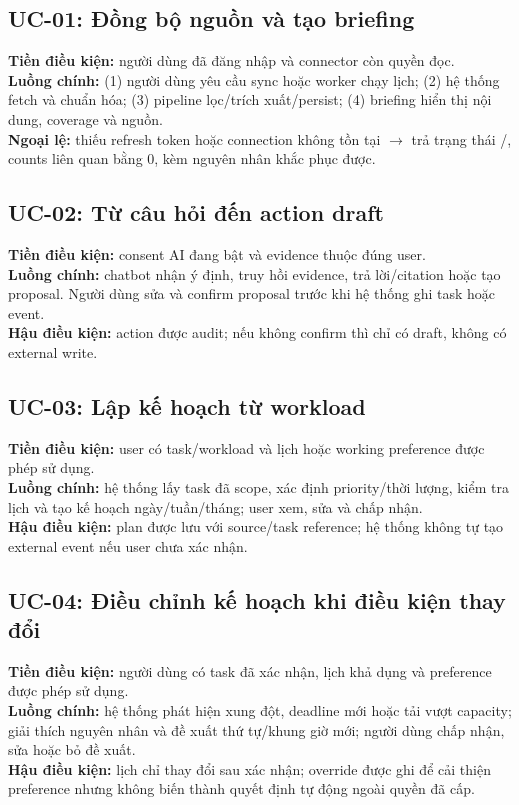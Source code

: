 \documentclass[12pt,a4paper]{article}
\begin{document}
\subsection{UC-01: Đồng bộ nguồn và tạo briefing}
\textbf{Tiền điều kiện:} người dùng đã đăng nhập và connector còn quyền đọc.\\
\textbf{Luồng chính:} (1) người dùng yêu cầu sync hoặc worker chạy lịch; (2) hệ thống fetch và chuẩn hóa; (3) pipeline lọc/trích xuất/persist; (4) briefing hiển thị nội dung, coverage và nguồn.\\
\textbf{Ngoại lệ:} thiếu refresh token hoặc connection không tồn tại $\rightarrow$ trả trạng thái /, counts liên quan bằng 0, kèm nguyên nhân khắc phục được.

\subsection{UC-02: Từ câu hỏi đến action draft}
\textbf{Tiền điều kiện:} consent AI đang bật và evidence thuộc đúng user.\\
\textbf{Luồng chính:} chatbot nhận ý định, truy hồi evidence, trả lời/citation hoặc tạo proposal. Người dùng sửa và confirm proposal trước khi hệ thống ghi task hoặc event.\\
\textbf{Hậu điều kiện:} action được audit; nếu không confirm thì chỉ có draft, không có external write.

\subsection{UC-03: Lập kế hoạch từ workload}
\textbf{Tiền điều kiện:} user có task/workload và lịch hoặc working preference
được phép sử dụng.\\
\textbf{Luồng chính:} hệ thống lấy task đã scope, xác định priority/thời lượng,
kiểm tra lịch và tạo kế hoạch ngày/tuần/tháng; user xem, sửa và chấp nhận.\\
\textbf{Hậu điều kiện:} plan được lưu với source/task reference; hệ thống không
tự tạo external event nếu user chưa xác nhận.

\subsection{UC-04: Điều chỉnh kế hoạch khi điều kiện thay đổi}
\textbf{Tiền điều kiện:} người dùng có task đã xác nhận, lịch khả dụng và preference
được phép sử dụng.\\
\textbf{Luồng chính:} hệ thống phát hiện xung đột, deadline mới hoặc tải vượt
capacity; giải thích nguyên nhân và đề xuất thứ tự/khung giờ mới; người dùng chấp
nhận, sửa hoặc bỏ đề xuất.\\
\textbf{Hậu điều kiện:} lịch chỉ thay đổi sau xác nhận; override được ghi để cải
thiện preference nhưng không biến thành quyết định tự động ngoài quyền đã cấp.
\end{document}
